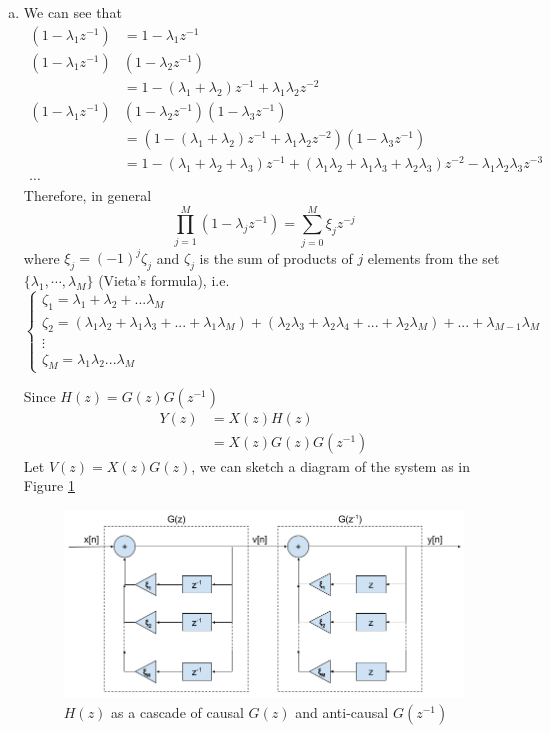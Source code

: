 \begin{enumerate}[(a)]
\item We can see that
\begin{align*}
(1 - \lambda_1 z^{-1}) &= 1 - \lambda_1 z^{-1} \\
(1 - \lambda_1 z^{-1})&(1 - \lambda_2z^{-1}) \\ &= 1 - (\lambda_1 + \lambda_2)z^{-1} + \lambda_1 \lambda_2 z^{-2} \\
(1 - \lambda_1 z^{-1})&(1 - \lambda_2 z^{-1})(1 - \lambda_3 z^{-1}) \\ &= (1 - (\lambda_1 + \lambda_2)z^{-1} + \lambda_1 \lambda_2 z^{-2})(1 - \lambda_3 z^{-1}) \\
&= 1 - (\lambda_1 + \lambda_2 + \lambda_3)z^{-1} + (\lambda_1\lambda_2 + \lambda_1\lambda_3 + \lambda_2\lambda_3)z^{-2} - \lambda_1\lambda_2\lambda_3 z^{-3} \\
\cdots
\end{align*}
Therefore, in general
\[\prod_{j=1}^{M} (1-\lambda_j z^{-1}) = \sum_{j=0}^M \xi_j z^{-j}\]
where $\xi_j = (-1)^j \zeta_j$ and $\zeta_j$ is the sum of products of $j$ elements from the set $\{\lambda_1, \cdots, \lambda_M\}$ (Vieta's formula), i.e.
\[\begin{cases}
\zeta_1 = \lambda_1 + \lambda_2 + ... \lambda_M \\
\zeta_2 = (\lambda_1\lambda_2 + \lambda_1\lambda_3 + ... + \lambda_1\lambda_M) + (\lambda_2\lambda_3 + \lambda_2\lambda_4 + ... + \lambda_2\lambda_M) + ... + \lambda_{M-1}\lambda_M \\
\vdots \\
\zeta_M = \lambda_1 \lambda_2 ... \lambda_M 
\end{cases}\]

Since $H(z) = G(z)G(z^{-1})$
\begin{align*}
Y(z) 
&= X(z)H(z) \\
&= X(z)G(z)G(z^{-1})
\end{align*}
Let $V(z) = X(z)G(z)$, we can sketch a diagram of the system as in Figure \ref{fig:p5d}


\begin{figure}[htbp]
	\centering
	\includegraphics[width=\linewidth]{images/p5d}
	\caption{$H(z)$ as a cascade of causal $G(z)$ and anti-causal $G(z^{-1})$}
	\label{fig:p5d}
\end{figure}
\end{enumerate}